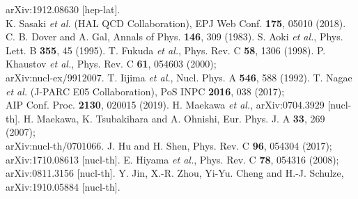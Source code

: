 \documentclass[12pt]{article}
\begin{document}
\begin{thebibliography}{99}
                            arXiv:1912.08630 [hep-lat].\\
             K. Sasaki {\it et al.} (HAL QCD Collaboration), EPJ Web Conf. {\bf 175}, 05010 (2018).
 C. B. Dover and A. Gal, Annals of Phys. {\bf 146}, 309 (1983).
 S. Aoki {\it et al.}, Phys. Lett. B {\bf 355}, 45 (1995).
 T. Fukuda {\it et al.}, Phys. Rev. C {\bf 58}, 1306 (1998).
 P. Khaustov {\it et al.}, Phys. Rev. C {\bf 61}, 054603 (2000);\\
                                      arXiv:nucl-ex/9912007.
 T. Iijima {\it et al.}, Nucl. Phys. A {\bf 546}, 588 (1992).
 T. Nagae {\it et al.} (J-PARC E05 Collaboration), PoS INPC {\bf 2016}, 038 (2017);\\
                                     AIP Conf. Proc. {\bf 2130}, 020015 (2019).
 H. Maekawa {\it et al.}, arXiv:0704.3929 [nucl-th].
 H. Maekawa, K. Tsubakihara and A. Ohnishi, Eur. Phys. J. A {\bf 33}, 269 (2007);\\
                                      arXiv:nucl-th/0701066.
 J. Hu and H. Shen, Phys. Rev. C {\bf 96}, 054304 (2017);\\
                                      arXiv:1710.08613 [nucl-th].
 E. Hiyama {\it et al.}, Phys. Rev. C {\bf 78}, 054316 (2008);\\
                                      arXiv:0811.3156 [nucl-th].
 Y. Jin, X.-R. Zhou, Yi-Yu. Cheng and H.-J. Schulze, arXiv:1910.05884 [nucl-th].


\end{thebibliography}
\end{document}
